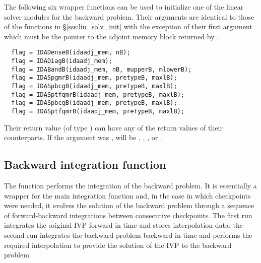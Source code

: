 The following six wrapper functions can be used to initialize one of the linear
solver modules for the backward problem. Their arguments are identical to those
of the functions in \S\ref{sss:lin_solv_init} with the exception of their first
argument which must be the pointer to the adjoint memory block returned by
.
\begin{verbatim}
  flag = IDADenseB(idaadj_mem, nB);
  flag = IDADiagB(idaadj_mem);
  flag = IDABandB(idaadj_mem, nB, mupperB, mlowerB);
  flag = IDASpgmrB(idaadj_mem, pretypeB, maxlB);
  flag = IDASpbcgB(idaadj_mem, pretypeB, maxlB);
  flag = IDASptfqmrB(idaadj_mem, pretypeB, maxlB);
  flag = IDASpbcgB(idaadj_mem, pretypeB, maxlB);
  flag = IDASptfqmrB(idaadj_mem, pretypeB, maxlB);
\end{verbatim}
Their return value  (of type ) can have any of the return values 
of their counterparts.
If the  argument was ,  will be
, , 
, or .

\subsection{Backward integration function}
\label{sss:idasolveb}

The function  performs the integration of the backward problem.
It is essentially a wrapper for the {\idas} main integration function 
 and, in the case in which checkpoints were needed, it evolves 
the solution of the backward problem through a sequence of forward-backward 
integrations between consecutive checkpoints. 
The first run integrates the original IVP forward in time and
stores interpolation data; the second run integrates the backward problem 
backward in time and performs the required interpolation to provide
the solution of the IVP to the backward problem.

